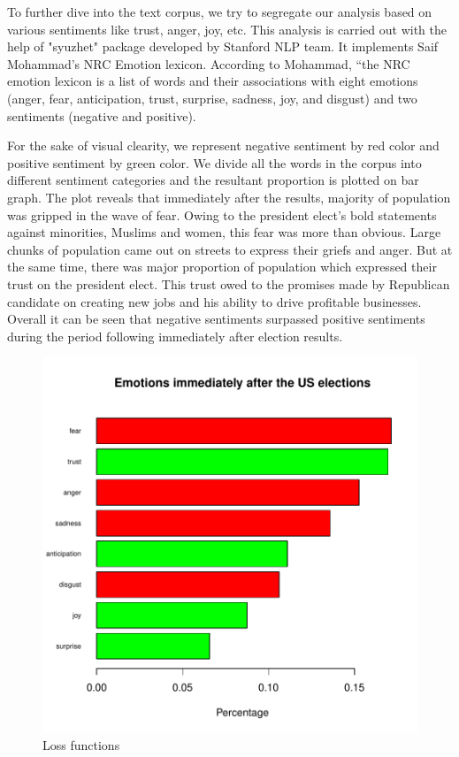 \documentclass[a4paper,12pt]{book}
\theoremstyle{break}
\begin{document}
To further dive into the text corpus, we try to segregate our analysis based on various sentiments like trust, anger, joy, etc. This analysis is carried out with the help of "syuzhet" package developed by Stanford NLP team. It implements Saif Mohammad’s NRC Emotion lexicon. According to Mohammad, “the NRC emotion lexicon is a list of words and their associations with eight emotions (anger, fear, anticipation, trust, surprise, sadness, joy, and disgust) and two sentiments (negative and positive). 



For the sake of visual clearity, we represent negative sentiment by red color and positive sentiment by green color. We divide all the words in the corpus into different sentiment categories and the resultant proportion is plotted on bar graph. The plot reveals that immediately after the results, majority of population was gripped in the wave of fear. Owing to the president elect's bold statements against minorities, Muslims and women, this fear was more than obvious. Large chunks of population came out on streets to express their griefs and anger. But at the same time, there was major proportion of population which expressed their trust on the president elect. This trust owed to the promises made by Republican candidate on creating new jobs and his ability to drive profitable businesses. Overall it can be seen that negative sentiments surpassed positive sentiments during the period following immediately after election results.


\begin{figure}[!]
\centering
\includegraphics{finnn-r5}
\caption{Loss functions}
\label{fig:1}
\end{figure}
\end{document}
